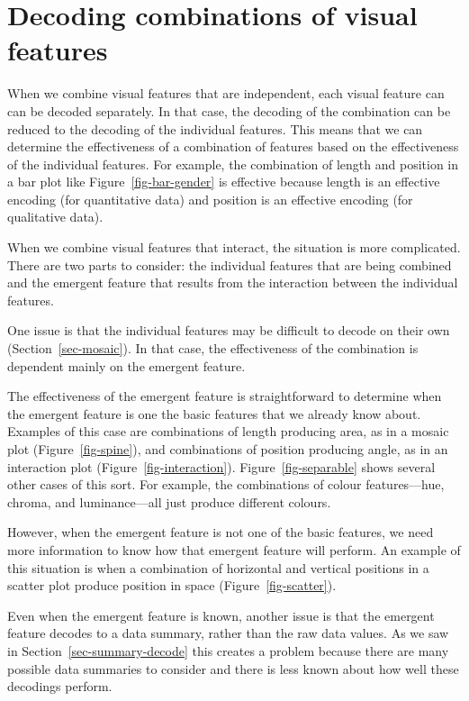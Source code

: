 \documentclass[
  letterpaper,
  DIV=11,
  numbers=noendperiod]{scrreprt}
\begin{document}
\section{Decoding combinations of visual
features}\label{sec-decode-combine}

When we combine visual features that are independent, each visual
feature can can be decoded separately. In that case, the decoding of the
combination can be reduced to the decoding of the individual features.
This means that we can determine the effectiveness of a combination of
features based on the effectiveness of the individual features. For
example, the combination of length and position in a bar plot like
Figure~\ref{fig-bar-gender} is effective because length is an effective
encoding (for quantitative data) and position is an effective encoding
(for qualitative data).

When we combine visual features that interact, the situation is more
complicated. There are two parts to consider: the individual features
that are being combined and the emergent feature that results from the
interaction between the individual features.

One issue is that the individual features may be difficult to decode on
their own (Section~\ref{sec-mosaic}). In that case, the effectiveness of
the combination is dependent mainly on the emergent feature.

The effectiveness of the emergent feature is straightforward to
determine when the emergent feature is one the basic features that we
already know about. Examples of this case are combinations of length
producing area, as in a mosaic plot (Figure~\ref{fig-spine}), and
combinations of position producing angle, as in an interaction plot
(Figure~\ref{fig-interaction}). Figure~\ref{fig-separable} shows several
other cases of this sort. For example, the combinations of colour
features---hue, chroma, and luminance---all just produce different
colours.

However, when the emergent feature is not one of the basic features, we
need more information to know how that emergent feature will perform. An
example of this situation is when a combination of horizontal and
vertical positions in a scatter plot produce position in space
(Figure~\ref{fig-scatter}).

Even when the emergent feature is known, another issue is that the
emergent feature decodes to a data summary, rather than the raw data
values. As we saw in Section~\ref{sec-summary-decode} this creates a
problem because there are many possible data summaries to consider and
there is less known about how well these decodings perform.
\end{document}
